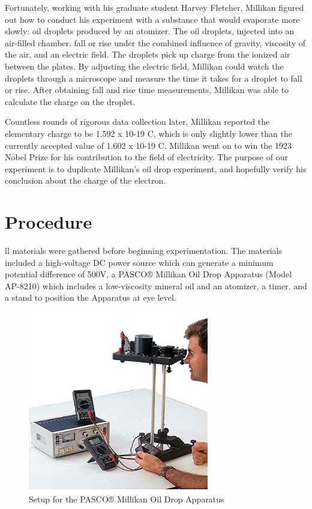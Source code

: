 \documentclass[]{article}
\begin{document}
Fortunately, working with his graduate student Harvey Fletcher, Millikan figured out how to conduct his experiment with a substance that would evaporate more slowly: oil droplets produced by an atomizer. The oil droplets, injected into an air-filled chamber, fall or rise under the combined influence of gravity, viscosity of the air, and an electric field. The droplets pick up charge from the ionized air between the plates. By adjusting the electric field, Millikan could watch the droplets through a microscope and measure the time it takes for a droplet to fall or rise. After obtaining fall and rise time measurements, Millikan was able to calculate the charge on the droplet. 

Countless rounds of rigorous data collection later, Millikan reported the elementary charge to be 1.592 x 10-19 C, which is only slightly lower than the currently accepted value of 1.602 x 10-19 C. Millikan went on to win the 1923 Nobel Prize for his contribution to the field of electricity. The purpose of our experiment is to duplicate Millikan’s oil drop experiment, and hopefully verify his conclusion about the charge of the electron.
\section{Procedure}
ll materials were gathered before beginning experimentation. The materials included a high-voltage DC power source which can generate a minimum potential difference of 500V, a PASCO® Millikan Oil Drop Apparatus (Model AP-8210) which includes a low-viscosity mineral oil and an atomizer, a timer, and a stand to position the Apparatus at eye level. 

\begin{figure}[h]
	\begin{center}
		\includegraphics[width=3.1in]{pic}
	\end{center}
	\caption{ Setup for the PASCO® Millikan Oil Drop Apparatus
	}
\end{figure}
\end{document}
